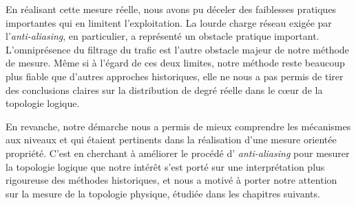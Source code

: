 En réalisant cette mesure réelle, nous avons pu déceler des faiblesses pratiques
importantes qui en limitent l'exploitation. La lourde charge réseau exigée par
l'{\em anti-aliasing}, en particulier, a représenté un obstacle pratique
important. L'omniprésence du filtrage du trafic \icmp est l'autre obstacle
majeur de notre méthode de mesure. Même si à l'égard de ces deux limites, notre
méthode reste beaucoup plus fiable que d'autres approches historiques, elle ne
nous a pas permis de tirer des conclusions claires sur la distribution de degré
réelle dans le c\oe{}ur de la topologie logique.

En revanche, notre démarche nous a permis de mieux comprendre les mécanismes aux
niveaux \LL et \LLL qui étaient pertinents dans la réalisation d'une mesure
orientée propriété. C'est en cherchant à améliorer le procédé d'{\em
anti-aliasing} pour mesurer la topologie logique que notre intérêt s'est porté
sur une interprétation plus rigoureuse des méthodes historiques, et nous a
motivé à porter notre attention sur la mesure de la topologie physique, étudiée
dans les chapitres suivants.
